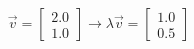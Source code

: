 \documentclass[preview]{standalone}
\begin{document}
\begin{align*}
\vec{v} = \begin{bmatrix} 2.0 \\ 1.0 \end{bmatrix}\rightarrow \lambda \vec{v} = \begin{bmatrix} 1.0 \\ 0.5 \end{bmatrix}
\end{align*}
\end{document}
